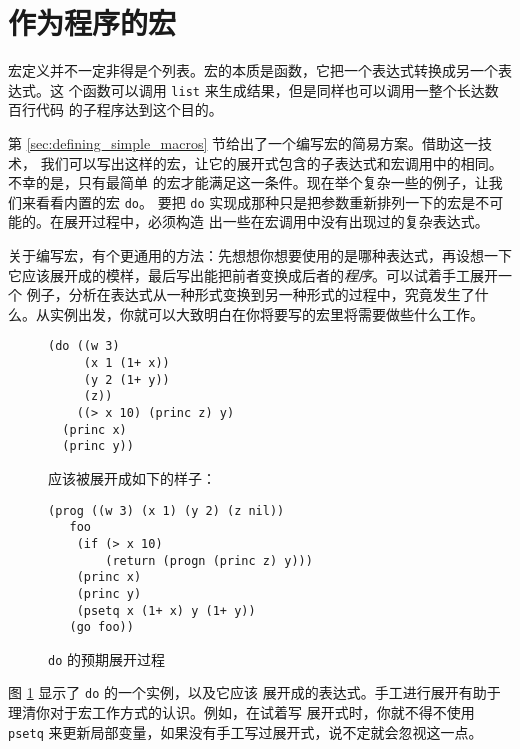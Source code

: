 \section{作为程序的宏}
\label{sec:macros_as_programs}

宏定义并不一定非得是个\bq{}列表。宏的本质是函数，它把一个表达式转换成另一个表达式。这
个函数可以调用 \verb|list| 来生成结果，但是同样也可以调用一整个长达数百行代码
的子程序达到这个目的。

第 \ref{sec:defining_simple_macros} 节给出了一个编写宏的简易方案。借助这一技术，
我们可以写出这样的宏，让它的展开式包含的子表达式和宏调用中的相同。不幸的是，只有最简单
的宏才能满足这一条件。现在举个复杂一些的例子，让我们来看看内置的宏 \verb|do|。
要把 \verb|do| 实现成那种只是把参数重新排列一下的宏是不可能的。在展开过程中，必须构造
出一些在宏调用中没有出现过的复杂表达式。

关于编写宏，有个更通用的方法：先想想你想要使用的是哪种表达式，再设想一下
它应该展开成的模样，最后写出能把前者变换成后者的\emph{程序}。可以试着手工展开一个
例子，分析在表达式从一种形式变换到另一种形式的过程中，究竟发生了什么。从实例出发，你就可以大致明白在你将要写的宏里将需要做些什么工作。

\begin{figure}
\begin{lstlisting}
(do ((w 3)
     (x 1 (1+ x))
     (y 2 (1+ y))
     (z))
    ((> x 10) (princ z) y)
  (princ x)
  (princ y))
\end{lstlisting}
应该被展开成如下的样子：
\begin{lstlisting}
(prog ((w 3) (x 1) (y 2) (z nil))
   foo
    (if (> x 10)
        (return (progn (princ z) y)))
    (princ x)
    (princ y)
    (psetq x (1+ x) y (1+ y))
   (go foo))
\end{lstlisting}
\caption{\label{fig:desired_expansion_of_do} \texttt{do} 的预期展开过程}
\end{figure}

图 \ref{fig:desired_expansion_of_do} 显示了 \verb|do| 的一个实例，以及它应该
展开成的表达式。手工进行展开有助于理清你对于宏工作方式的认识。例如，在试着写
展开式时，你就不得不使用 \verb|psetq| 来更新局部变量，如果没有手工写过展开式，说不定就会忽视这一点。

